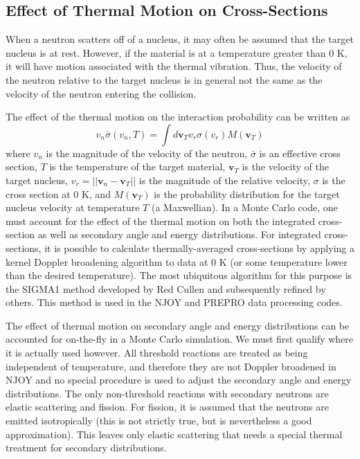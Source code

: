 \subsection{Effect of Thermal Motion on Cross-Sections}
\label{sec:freegas}

When a neutron scatters off of a nucleus, it may often be assumed that the
target nucleus is at rest. However, if the material is at a temperature greater
than 0 K, it will have motion associated with the thermal vibration. Thus, the
velocity of the neutron relative to the target nucleus is in general not the
same as the velocity of the neutron entering the collision.

The effect of the thermal motion on the interaction probability can be written
as
\begin{equation}
  \label{eq:doppler-broaden}
  v_n \bar{\sigma} (v_n, T) = \int d\mathbf{v}_T v_r \sigma(v_r)
  M (\mathbf{v}_T)
\end{equation}
where $v_n$ is the magnitude of the velocity of the neutron, $\bar{\sigma}$ is
an effective cross section, $T$ is the temperature of the target material,
$\mathbf{v}_T$ is the velocity of the target nucleus, $v_r = || \mathbf{v}_n -
\mathbf{v}_T ||$ is the magnitude of the relative velocity, $\sigma$ is the
cross section at 0 K, and $M (\mathbf{v}_T)$ is the probability distribution for
the target nucleus velocity at temperature $T$ (a Maxwellian). In a Monte Carlo
code, one must account for the effect of the thermal motion on both the
integrated cross-section as well as secondary angle and energy
distributions. For integrated cross-sections, it is possible to calculate
thermally-averaged cross-sections by applying a kernel Doppler broadening
algorithm to data at 0 K (or some temperature lower than the desired
temperature). The most ubiquitous algorithm for this purpose is the SIGMA1
method \cite{nse-cullen-1976} developed by Red Cullen and subsequently refined
by others. This method is used in the NJOY \cite{nds-macfarlane-2010} and PREPRO
\cite{iaea-cullen-2010} data processing codes.

The effect of thermal motion on secondary angle and energy distributions can be
accounted for on-the-fly in a Monte Carlo simulation. We must first qualify
where it is actually used however. All threshold reactions are treated as being
independent of temperature, and therefore they are not Doppler broadened in NJOY
and no special procedure is used to adjust the secondary angle and energy
distributions. The only non-threshold reactions with secondary neutrons are
elastic scattering and fission. For fission, it is assumed that the neutrons are
emitted isotropically (this is not strictly true, but is nevertheless a good
approximation). This leaves only elastic scattering that needs a special thermal
treatment for secondary distributions.

